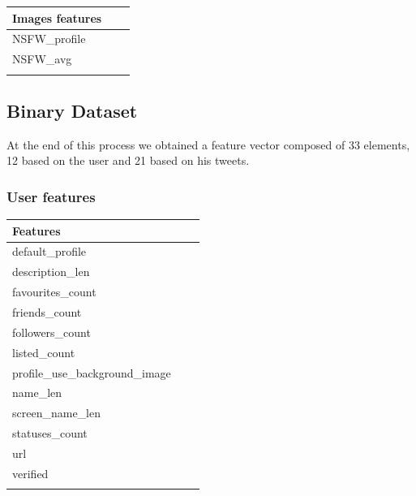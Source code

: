 \begin{center}
	\begin{tabular}{lll}
		\textbf{Images features}\\
		\hline\hline
		NSFW\_profile\\
		NSFW\_avg\\\hline\\
	\end{tabular}
\end{center}

\normalsize

\subsection{Binary Dataset}
At the end of this process we obtained a feature vector composed of 33 elements, 12 based on the user and 21 based on his tweets.

\subsubsection{User features}


\small
\begin{center}
	\begin{tabular}{lll}
		\textbf{Features}\\
		\hline\hline
		default\_profile\\
		description\_len\\
		favourites\_count\\
		friends\_count\\
		followers\_count\\
		listed\_count\\
		profile\_use\_background\_image\\
		name\_len\\
		screen\_name\_len\\
		statuses\_count\\
		url\\
		verified\\
		\hline\\
		
	\end{tabular}
\end{center}
\normalsize

